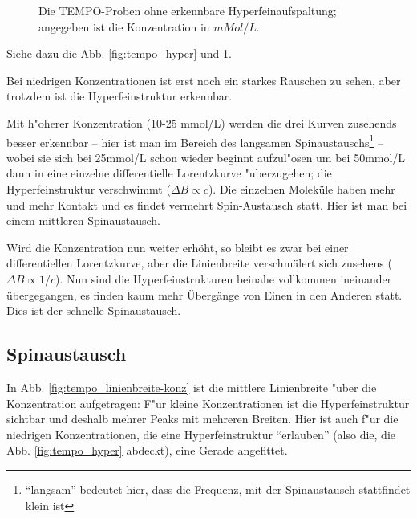 \documentclass[a4paper,12pt]{article}
\begin{document}
\begin{figure}[!h]
  \centering
  \caption{Die TEMPO-Proben ohne erkennbare Hyperfeinaufspaltung;
    angegeben ist die Konzentration in $mMol/L$.}
  \label{fig:tempo_kein-hyper}
\end{figure}


Siehe dazu die Abb. \ref{fig:tempo_hyper} und \ref{fig:tempo_kein-hyper}.

Bei niedrigen Konzentrationen ist erst noch ein starkes Rauschen zu
sehen, aber trotzdem ist die Hyperfeinstruktur erkennbar.

Mit h"oherer Konzentration (10-25 mmol/L) werden die drei Kurven
zusehends besser erkennbar -- hier ist man im Bereich des langsamen
Spinaustauschs\footnote{"`langsam"' bedeutet hier, dass die Frequenz,
  mit der Spinaustausch stattfindet klein ist} -- wobei sie sich bei 25mmol/L schon wieder
beginnt aufzul"osen um bei 50mmol/L dann in eine einzelne
differentielle Lorentzkurve "uberzugehen; die Hyperfeinstruktur
verschwimmt ($\Delta B \propto c$).  Die einzelnen Moleküle haben mehr und mehr Kontakt und
es findet vermehrt Spin-Austausch statt.  Hier ist man bei einem
mittleren Spinaustausch.

Wird die Konzentration nun weiter erhöht, so bleibt es zwar bei einer
differentiellen Lorentzkurve, aber die Linienbreite verschmälert sich
zusehens ($\Delta B \propto 1/c$). Nun sind die
Hyperfeinstrukturen beinahe vollkommen ineinander übergegangen, es
finden kaum mehr Übergänge von Einen in den Anderen statt. Dies ist
der schnelle Spinaustausch.


\subsection{Spinaustausch}
\label{sec:spinaustausch}

In Abb. \ref{fig:tempo_linienbreite-konz} ist die mittlere
Linienbreite "uber die Konzentration aufgetragen: F"ur kleine
Konzentrationen ist die Hyperfeinstruktur sichtbar und deshalb mehrer
Peaks mit mehreren Breiten. Hier ist auch f"ur die niedrigen
Konzentrationen, die eine Hyperfeinstruktur "`erlauben"' (also die,
die Abb. \ref{fig:tempo_hyper} abdeckt), eine Gerade angefittet.
\end{document}
